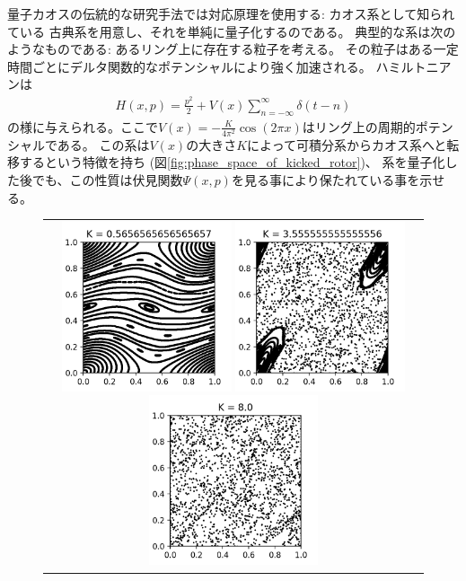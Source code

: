 量子カオスの伝統的な研究手法では対応原理を使用する: カオス系として知られている
古典系を用意し、それを単純に量子化するのである。
典型的な系は次のようなものである\cite{ullmo}: あるリング上に存在する粒子を考える。
その粒子はある一定時間ごとにデルタ関数的なポテンシャルにより強く加速される。
ハミルトニアンは
\begin{align}
	H(x, p) = \frac{p^2}{2} + V(x)\sum_{n=-\infty}^{\infty}\delta(t-n)
	\label{eq:kicked_rotor}
\end{align}
の様に与えられる。ここで$V(x) = -\frac{K}{4\pi^2}\cos(2\pi x)$はリング上の周期的ポテンシャルである。
この系は$V(x)$の大きさ$K$によって可積分系からカオス系へと転移するという特徴を持ち
(図\ref{fig:phase_space_of_kicked_rotor})、
系を量子化した後でも、この性質は伏見関数$\Psi(x, p)$を見る事により保たれている事を示せる\cite{ullmo}。
\begin{figure}[ht]
	\centering
	\begin{tabular}{c}
		\begin{minipage}{0.33\hsize}
			\centering
			\includegraphics[width=5cm]{figures/figure7}
		\end{minipage}
		\begin{minipage}{0.33\hsize}
			\centering
			\includegraphics[width=5cm]{figures/figure44}
		\end{minipage}
		\begin{minipage}{0.33\hsize}
			\centering
			\includegraphics[width=5cm]{figures/figure99}

\end{minipage}
\end{tabular}
\end{figure}
